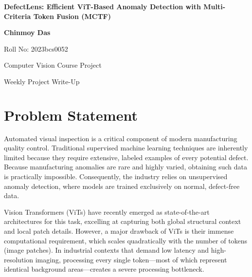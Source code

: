\documentclass[12pt]{article}
\begin{document}
\begin{center}
    {\LARGE \textbf{DefectLens: Efficient ViT-Based Anomaly Detection with Multi-Criteria Token Fusion (MCTF)} \par}
    \vspace{0.5cm}
    {\large \textbf{Chinmoy Das} \par}
    {\large Roll No: 2023bcs0052 \par}
    {\large Computer Vision Course Project \par}
    {\large Weekly Project Write-Up \par}
    \vspace{0.5cm}
\end{center}

\begin{abstract}
\noindent This write-up delineates the core objectives and underlying architecture of the DefectLens project. It focuses on the computational limitations of applying standard Vision Transformers (ViTs) to high-resolution automated anomaly detection. Furthermore, it details the integration of a Multi-Criteria Token Fusion (MCTF) mechanism designed to facilitate high-speed edge processing, effectively balancing the dual requirements of low-latency inference and high-accuracy defect localization in industrial settings.
\end{abstract}

\vspace{0.5cm}

\section{Problem Statement}
Automated visual inspection is a critical component of modern manufacturing quality control. Traditional supervised machine learning techniques are inherently limited because they require extensive, labeled examples of every potential defect. Because manufacturing anomalies are rare and highly varied, obtaining such data is practically impossible. Consequently, the industry relies on unsupervised anomaly detection, where models are trained exclusively on normal, defect-free data.

Vision Transformers (ViTs) have recently emerged as state-of-the-art architectures for this task, excelling at capturing both global structural context and local patch details. However, a major drawback of ViTs is their immense computational requirement, which scales quadratically with the number of tokens (image patches). In industrial contexts that demand low latency and high-resolution imaging, processing every single token---most of which represent identical background areas---creates a severe processing bottleneck.
\end{document}
